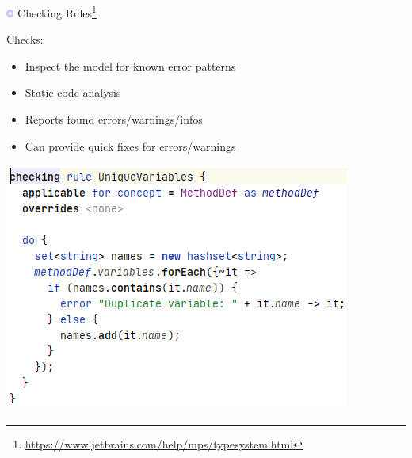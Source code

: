 	\begin{frame}{\includegraphics[height=0.25cm]{graphics/checkingrules.png} Checking Rules\footnote{\url{https://www.jetbrains.com/help/mps/typesystem.html}}}
		\begin{minipage}{0.52\textwidth}
			Checks:
			\begin{itemize}
				\item Inspect the model for known error patterns
				\item Static code analysis
				\item Reports found errors/warnings/infos
				\item Can provide quick fixes for errors/warnings
			\end{itemize}
		\end{minipage}
		\begin{minipage}{0.4\textwidth}
			\includegraphics[height=0.8\textheight]{illustrations/check.png}
		\end{minipage}
	\end{frame}
	
